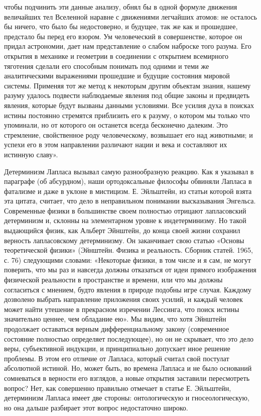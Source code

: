 чтобы подчинить эти данные анализу,  обнял бы в одной формуле движения
величайших  тел Вселенной  наравне с  движениями легчайших  атомов: не
осталось бы  ничего, что было бы  недостоверно, и будущее, так  же как
и  прошедшее,  предстало  бы  перед  его  взором.  Ум  человеческий  в
совершенстве, которое  он придал астрономии, дает  нам представление о
слабом наброске  того разума.  Его открытия в  механике и  геометрии в
соединении  с открытием  всемирного  тяготения  сделали его  способным
понимать под одними  и теми же аналитическими  выражениями прошедшие и
будущие состояния мировой  системы. Применяя тот же  метод к некоторым
другим  объектам знания,  нашему разуму  удалось подвести  наблюдаемые
явления под общие  законы и предвидеть явления,  которые будут вызваны
данными  условиями.  Все  усилия   духа  в  поисках  истины  постоянно
стремятся приблизить его к разуму,  о котором мы только что упоминали,
но от которого он останется всегда бесконечно далеким. Это стремление,
свойственное роду человеческому, возвышает его над животными; и успехи
его в этом направлении различают нации и века и составляют их истинную
славу».

Детерминизм  Лапласа  вызывал  самую   разнообразную  реакцию.  Как  я
указывал  в параграфе  (об  абсурдном),  наши ортодоксальные  философы
обвиняли  Лапласа  в  фатализме  и  даже  в  уклоне  в  мистицизм.  Е.
Эйльштейн, из  статьи которой  взята эта цитата,  считает, что  дело в
неправильном  понимании высказывания  Энгельса.  Современные физики  в
большинстве  своем  полностью  отрицают  лапласовский  детерминизм  и,
склонны на  элементарном уровне к индетерминизму.  Но такой выдающийся
физик, как  Альберт Эйнштейн, до  конца своей жизни  сохранил верность
лапласовскому  детерминизму.   Он  заканчивает  свою   статью  «Основы
теоретической физики» (Эйнштейн. Физика  и реальность. Сборник статей.
1965, с.  76) следующими словами: «Некоторые  физики, в том числе  и я
сам, не  могут поверить, что  мы раз  и навсегда должны  отказаться от
идеи  прямого  изображения  физической  реальности  в  пространстве  и
времени,  или что  мы должны  согласиться с  мнением, будто  явления в
природе  подобны игре  случая. Каждому  дозволено выбрать  направление
приложения  своих  усилий,  и  каждый  человек  может  найти  утешение
в  прекрасном   изречении  Лессинга,  что  поиск   истины  значительно
ценнее,  чем обладание  ею». Мы  видим, что  хотя Эйнштейн  продолжает
оставаться  верным  дифференциальному  закону  (современное  состояние
полностью определяет  последующее), но  он не  скрывает, что  это дело
веры, субъективной  индукции, и  принципиально допускает  иное решение
проблемы. В этом его отличие  от Лапласа, который считал свой постулат
абсолютной  истиной. Но,  может быть,  во  времена Лапласа  и не  было
оснований  сомневаться  в  верности  его взглядов,  а  новые  открытия
заставили пересмотреть вопрос? Нет,  как совершенно правильно отмечает
в  статье  Е.  Эйльштейн,   детерминизм  Лапласа  имеет  две  стороны:
онтологическую и гносеологическую, но она дальше разбирает этот вопрос
недостаточно широко.

